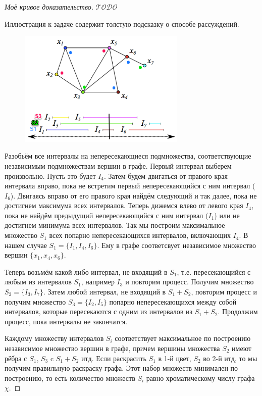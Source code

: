 \documentclass[a4paper,12pt]{article}
\numberwithin{figure}{section}
\theoremstyle{remark}
\def\iiTODO{\guillemotleft$\mathcal{TODO}$\guillemotright\textellipsis}
\begin{document}
\begin{proof}[Моё кривое доказательство]

	\iiTODO

	Иллюстрация к задаче содержит толстую подсказку о способе рассуждений.

	\begin{figure}[H]
		\centering
		\includegraphics[width=8cm]{interval-graph-coloring--solution.png}
	\end{figure}

	Разобьём все интервалы на непересекающиеся подмножества, соответствующие независимым подмножествам вершин в графе. Первый интервал выберем произвольно. Пусть это будет $I_4$. Затем будем двигаться от правого края интервала вправо, пока не встретим первый непересекающийся с ним интервал ($I_6$). Двигаясь вправо от его правого края найдём следующий и так далее, пока не достигнем максимума всех интервалов. Теперь дижемся влево от левого края $I_4$, пока не найдём предыдущий непересекающийся с ним интервал ($I_1$) или не достигнем минимума всех интервалов. Так мы построим максимальное множество $S_1$ всех попарно непересекающихся интервалов, включающих $I_4$. В нашем случае $S_1=\{I_1,I_4,I_6\}$. Ему в графе соответсвует независимое множество вершин $\{x_1,x_4,x_6\}$.
	
	Теперь возьмём какой-либо интервал, не входящий в $S_1$, т.е. пересекающийся с любым из интервалов $S_1$, например $I_3$ и повторим процесс. Получим множество $S_2=\{I_3,I_7\}$. Затем любой интервал, не входящий в $S_1+S_2$, повторим процесс и получим множество $S_3=\{I_2,I_5\}$ попарно непересекающихся между собой интервалов, которые пересекаются с одним из интервалов из $S_1+S_2$. Продолжим процесс, пока интервалы не закончатся.
	
	Каждому множеству интервалов $S_i$ соответствует максимальное по построению независимое множество вершин в графе, причем вершины множества $S_2$ имеют рёбра с $S_1$, $S_3$ c $S_1+S_2$ итд. Если раскрасить $S_1$ в 1-й цвет, $S_2$ во 2-й итд, то мы получим правильную раскраску графа. Этот набор множеств минимален по построению, то есть количество множеств $S_i$ равно хроматическому числу графа $\chi$.
	

\end{proof}
\end{document}
